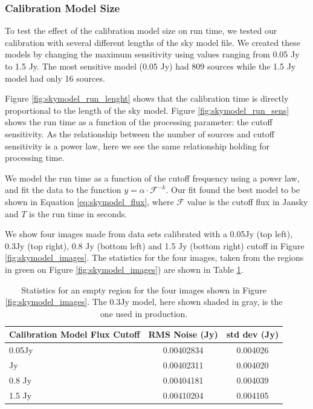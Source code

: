 \documentclass[preprint,5p]{elsarticle}
\begin{document}
\subsubsection{Calibration Model Size}
To test the effect of the calibration model size on run time, we tested our calibration with several different lengths of the sky model file. We created these models by changing the maximum sensitivity using values ranging from 0.05 Jy to 1.5 Jy. The most sensitive model (0.05 Jy) had 809 sources while the 1.5 Jy model had only 16 sources. 

Figure \ref{fig:skymodel_run_lenght} shows that the calibration time is directly proportional to the length of the sky model. Figure \ref{fig:skymodel_run_sens} shows the run time as a function of the processing parameter: the cutoff sensitivity. As the relationship between the number of sources and cutoff sensitivity is a power law, here we see the same relationship holding for processing time.

We model the run time as a function of the cutoff frequency using a power law, and fit the data to the function $y=\alpha\cdot \mathcal{F}^{-k}$. Our fit found the best model to be shown in Equation \ref{eq:skymodel_flux}, where $\mathcal{F}$ value is the cutoff flux in Jansky and $T$ is the run time in seconds. 

We show four images made from data sets calibrated with a 0.05Jy (top left), 0.3Jy (top right), 0.8 Jy (bottom left) and 1.5 Jy (bottom right) cutoff in Figure \ref{fig:skymodel_images}. The statistics for the four images, taken from the regions in green on Figure \ref{fig:skymodel_images}) are shown in Table \ref{table:skymodel_RMS}.


\begin{table}[h!]
\centering
\begin{tabular}{||p{2.6cm}| c | c||} 
 \hline
 Calibration Model Flux Cutoff & RMS Noise (Jy) & std dev (Jy) \\ [0.5ex]
 \hline
 0.05Jy & 0.00402834   & 0.004026    \\ 
  \rowcolor{Gray}
  \hline
 0.3 Jy & 0.00402311 & 0.004020 \\
 \hline
 0.8 Jy & 0.00404181 & 0.004039 \\  
 1.5 Jy & 0.00410204 & 0.004105\\
 \hline
\end{tabular}
\caption{Statistics for an empty region for the four images shown in Figure \ref{fig:skymodel_images}. The 0.3Jy model, here shown shaded in gray,  is the one used in production.  }
\label{table:skymodel_RMS}
\end{table}
\end{document}
